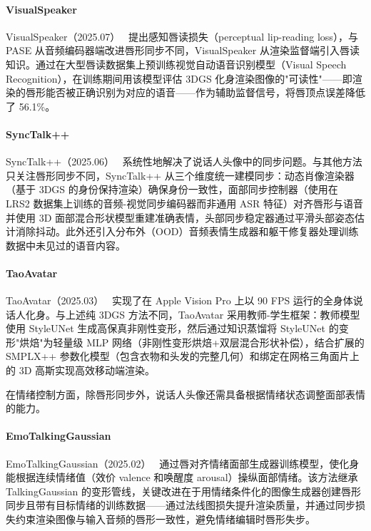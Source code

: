 \paragraph{VisualSpeaker}

VisualSpeaker（2025.07）~\cite{2507_06060} 提出感知唇读损失（perceptual lip-reading loss），与 PASE 从音频编码器端改进唇形同步不同，VisualSpeaker 从渲染监督端引入唇读知识。通过在大型唇读数据集上预训练视觉自动语音识别模型（Visual Speech Recognition），在训练期间用该模型评估 3DGS 化身渲染图像的"可读性"——即渲染的唇形能否被正确识别为对应的语音——作为辅助监督信号，将唇顶点误差降低了 56.1\%。

\paragraph{SyncTalk++}

SyncTalk++（2025.06）~\cite{2506_14742} 系统性地解决了说话人头像中的同步问题。与其他方法只关注唇形同步不同，SyncTalk++ 从三个维度统一建模同步：动态肖像渲染器（基于 3DGS 的身份保持渲染）确保身份一致性，面部同步控制器（使用在 LRS2 数据集上训练的音频-视觉同步编码器而非通用 ASR 特征）对齐唇形与语音并使用 3D 面部混合形状模型重建准确表情，头部同步稳定器通过平滑头部姿态估计消除抖动。此外还引入分布外（OOD）音频表情生成器和躯干修复器处理训练数据中未见过的语音内容。

\paragraph{TaoAvatar}

TaoAvatar（2025.03）~\cite{2503_17032} 实现了在 Apple Vision Pro 上以 90 FPS 运行的全身体说话人化身。与上述纯 3DGS 方法不同，TaoAvatar 采用教师-学生框架：教师模型使用 StyleUNet 生成高保真非刚性变形，然后通过知识蒸馏将 StyleUNet 的变形"烘焙"为轻量级 MLP 网络（非刚性变形烘焙+双层混合形状补偿），结合扩展的 SMPLX++ 参数化模型（包含衣物和头发的完整几何）和绑定在网格三角面片上的 3D 高斯实现高效移动端渲染。

在情绪控制方面，除唇形同步外，说话人头像还需具备根据情绪状态调整面部表情的能力。

\paragraph{EmoTalkingGaussian}

EmoTalkingGaussian（2025.02）~\cite{2502_00654} 通过唇对齐情绪面部生成器训练模型，使化身能根据连续情绪值（效价 valence 和唤醒度 arousal）操纵面部情绪。该方法继承 TalkingGaussian 的变形管线，关键改进在于用情绪条件化的图像生成器创建唇形同步且带有目标情绪的训练数据——通过法线图损失提升渲染质量，并通过同步损失约束渲染图像与输入音频的唇形一致性，避免情绪编辑时唇形失步。

